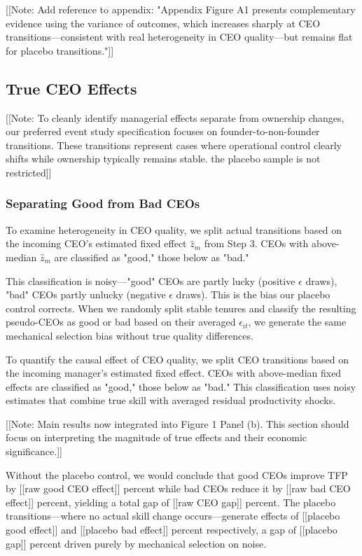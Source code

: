 \documentclass[11pt,a4paper]{article}
\begin{document}
[[Note: Add reference to appendix: "Appendix Figure A1 presents complementary evidence using the variance of outcomes, which increases sharply at CEO transitions—consistent with real heterogeneity in CEO quality—but remains flat for placebo transitions."]]

\subsection{True CEO Effects}

[[Note: To cleanly identify managerial effects separate from ownership changes, our preferred event study specification focuses on founder-to-non-founder transitions. These transitions represent cases where operational control clearly shifts while ownership typically remains stable. the placebo sample is not restricted]]

\subsubsection{Separating Good from Bad CEOs}

To examine heterogeneity in CEO quality, we split actual transitions based on the incoming CEO's estimated fixed effect $\hat{z}_m$ from Step 3. CEOs with above-median $\hat{z}_m$ are classified as "good," those below as "bad."

This classification is noisy—"good" CEOs are partly lucky (positive $\epsilon$ draws), "bad" CEOs partly unlucky (negative $\epsilon$ draws). This is the bias our placebo control corrects. When we randomly split stable tenures and classify the resulting pseudo-CEOs as good or bad based on their averaged $\epsilon_{it}$, we generate the same mechanical selection bias without true quality differences.



To quantify the causal effect of CEO quality, we split CEO transitions based on the incoming manager's estimated fixed effect. CEOs with above-median fixed effects are classified as "good," those below as "bad." This classification uses noisy estimates that combine true skill with averaged residual productivity shocks.

[[Note: Main results now integrated into Figure 1 Panel (b). This section should focus on interpreting the magnitude of true effects and their economic significance.]]

Without the placebo control, we would conclude that good CEOs improve TFP by [[raw good CEO effect]] percent while bad CEOs reduce it by [[raw bad CEO effect]] percent, yielding a total gap of [[raw CEO gap]] percent. The placebo transitions—where no actual skill change occurs—generate effects of [[placebo good effect]] and [[placebo bad effect]] percent respectively, a gap of [[placebo gap]] percent driven purely by mechanical selection on noise.
\end{document}
